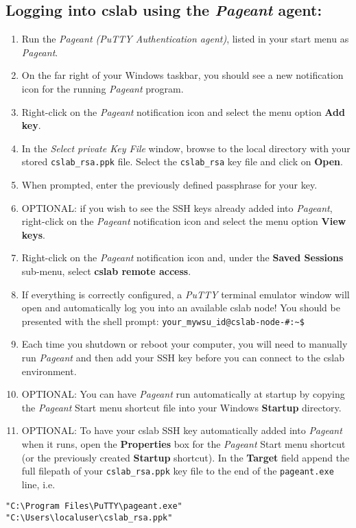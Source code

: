 \documentclass[12pt]{article}
\begin{document}
\begin{flushleft}
\subsection*{Logging into cslab using the \textit{Pageant} agent:}
\begin{enumerate}
  \item Run the \textit{Pageant (PuTTY Authentication agent)}, listed in your start menu as \textit{Pageant}.
  \item On the far right of your Windows taskbar, you should see a new notification icon for the running \textit{Pageant} program.
  \item Right-click on the \textit{Pageant} notification icon and select the menu option \textbf{Add key}.
  \item In the \textit{Select private Key File} window, browse to the local directory with your stored \verb|cslab_rsa.ppk| file. Select the \texttt{cslab\_rsa} key file and click on \textbf{Open}.
  \item When prompted, enter the previously defined passphrase for your key.
  \item OPTIONAL: if you wish to see the SSH keys already added into \textit{Pageant}, right-click on the \textit{Pageant} notification icon and select the menu option \textbf{View keys}.
  \item Right-click on the \textit{Pageant} notification icon and, under the \textbf{Saved Sessions} sub-menu, select \textbf{cslab remote access}.
  \item If everything is correctly configured, a \textit{PuTTY} terminal emulator window will open and automatically log you into an available cslab node! You should be presented with the shell prompt: 
    \verb|your_mywsu_id@cslab-node-#:~$|
  \item Each time you shutdown or reboot your computer, you will need to manually run \textit{Pageant} and then add your SSH key before you can connect to the cslab environment.
  \item OPTIONAL: You can have \textit{Pageant} run automatically at startup by copying the \textit{Pageant} Start menu shortcut file into your Windows \textbf{Startup} directory.
  \item OPTIONAL: To have your cslab SSH key automatically added into \textit{Pageant} when it runs, open the \textbf{Properties} box for the \textit{Pageant} Start menu shortcut (or the previously created \textbf{Startup} shortcut). In the \textbf{Target} field append the full filepath of your \verb|cslab_rsa.ppk| key file to the end of the \verb|pageant.exe| line, i.e.
\end{enumerate}
  \begin{verbatim}
"C:\Program Files\PuTTY\pageant.exe" "C:\Users\localuser\cslab_rsa.ppk"
  \end{verbatim}


\end{flushleft}
\end{document}
